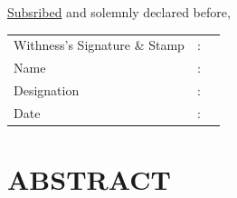 \documentclass[12pt, a4paper]{report}
\begin{document}
\noindent \underline{Subsribed} and solemnly declared before,

\vspace{2.5em}

\noindent
\begin{tabular}{@{}p{}p{}p{}@{}}
Withness's Signature \& Stamp & : & \underline{\hspace{6cm}} \\[1em]
Name                          & : & \underline{\hspace{6cm}} \\[1em]
Designation                   & : & \underline{\hspace{6cm}} \\[1em]
Date                          & : & \underline{\hspace{6cm}} \\
\end{tabular}

\newpage
\chapter*{ABSTRACT}
\end{document}
